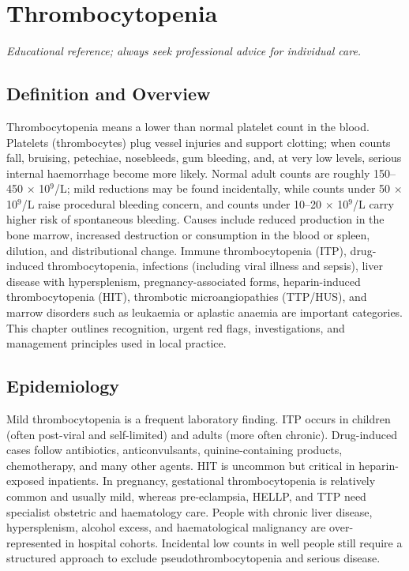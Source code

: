 \chapter{Thrombocytopenia}

\medskip
\noindent\textit{Educational reference; always seek professional advice for individual care.}

\section*{Definition and Overview}
Thrombocytopenia means a lower than normal platelet count in the blood. Platelets (thrombocytes) plug vessel injuries and support clotting; when counts fall, bruising, petechiae, nosebleeds, gum bleeding, and, at very low levels, serious internal haemorrhage become more likely. Normal adult counts are roughly 150--450 $\times$ 10$^9$/L; mild reductions may be found incidentally, while counts under 50 $\times$ 10$^9$/L raise procedural bleeding concern, and counts under 10--20 $\times$ 10$^9$/L carry higher risk of spontaneous bleeding. Causes include reduced production in the bone marrow, increased destruction or consumption in the blood or spleen, dilution, and distributional change. Immune thrombocytopenia (ITP), drug-induced thrombocytopenia, infections (including viral illness and sepsis), liver disease with hypersplenism, pregnancy-associated forms, heparin-induced thrombocytopenia (HIT), thrombotic microangiopathies (TTP/HUS), and marrow disorders such as leukaemia or aplastic anaemia are important categories. This chapter outlines recognition, urgent red flags, investigations, and management principles used in local practice.

\section*{Epidemiology}
Mild thrombocytopenia is a frequent laboratory finding. ITP occurs in children (often post-viral and self-limited) and adults (more often chronic). Drug-induced cases follow antibiotics, anticonvulsants, quinine-containing products, chemotherapy, and many other agents. HIT is uncommon but critical in heparin-exposed inpatients. In pregnancy, gestational thrombocytopenia is relatively common and usually mild, whereas pre-eclampsia, HELLP, and TTP need specialist obstetric and haematology care. People with chronic liver disease, hypersplenism, alcohol excess, and haematological malignancy are over-represented in hospital cohorts. Incidental low counts in well people still require a structured approach to exclude pseudothrombocytopenia and serious disease.

